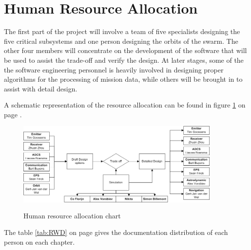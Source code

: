 \section{Human Resource Allocation}
\label{DDHR}
The first part of the project will involve a team of five specialists designing the five critical subsystems and one person designing the orbits of the swarm. The other four members will concentrate on the development of the software that will be used to assist the trade-off and verify the design. At later stages, some of the the software engineering personnel is heavily involved in designing proper algorithms for the processing of mission data, while others will be brought in to assist with detail design. 

A schematic representation of the resource allocation can be found in figure \ref{fig:DDBBHR} on page \pageref{fig:DDBBHR}.

\begin{figure}[ht!]
\begin{center}
\includegraphics[width=0.9\textwidth]{chapters/img/DDBBHR.jpg}
\label{fig:DDBBHR}
\caption{Human resource allocation chart}
\end{center}
\end{figure}

The table \ref{tab:RWD} on page \pageref{tab:RWD} gives the documentation distribution of each person on each chapter.

